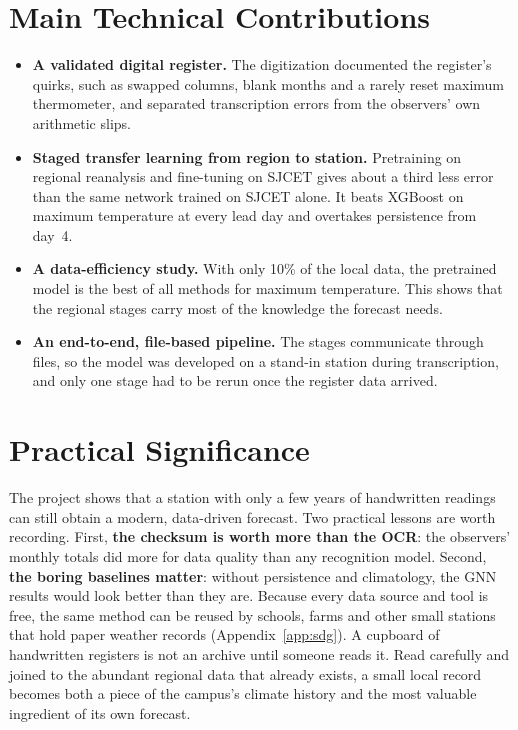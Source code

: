 \section{Main Technical Contributions}
\label{sec:con-contributions}

\begin{itemize}[itemsep=0pt,topsep=4pt]
    \item \textbf{A validated digital register.} The digitization documented the register's quirks, such as swapped columns, blank months and a rarely reset maximum thermometer, and separated transcription errors from the observers' own arithmetic slips.
    \item \textbf{Staged transfer learning from region to station.} Pretraining on regional reanalysis and fine-tuning on SJCET gives about a third less error than the same network trained on SJCET alone. It beats XGBoost on maximum temperature at every lead day and overtakes persistence from day~4.
    \item \textbf{A data-efficiency study.} With only 10\% of the local data, the pretrained model is the best of all methods for maximum temperature. This shows that the regional stages carry most of the knowledge the forecast needs.
    \item \textbf{An end-to-end, file-based pipeline.} The stages communicate through files, so the model was developed on a stand-in station during transcription, and only one stage had to be rerun once the register data arrived.
\end{itemize}

\section{Practical Significance}
\label{sec:con-significance}

The project shows that a station with only a few years of handwritten readings can still obtain a modern, data-driven forecast. Two practical lessons are worth recording. First, \textbf{the checksum is worth more than the OCR}: the observers' monthly totals did more for data quality than any recognition model. Second, \textbf{the boring baselines matter}: without persistence and climatology, the GNN results would look better than they are. Because every data source and tool is free, the same method can be reused by schools, farms and other small stations that hold paper weather records (Appendix~\ref{app:sdg}). A cupboard of handwritten registers is not an archive until someone reads it. Read carefully and joined to the abundant regional data that already exists, a small local record becomes both a piece of the campus's climate history and the most valuable ingredient of its own forecast.

